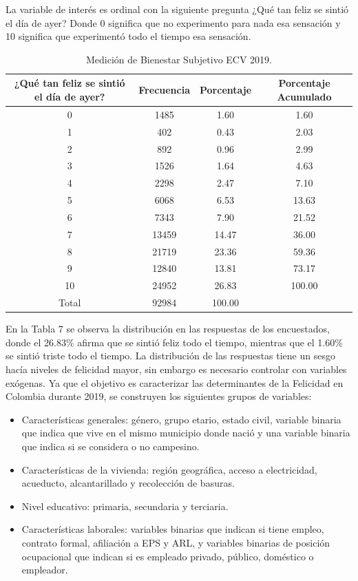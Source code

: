 \documentclass[12pt,spanish]{article}
\begin{document}
La variable de interés es ordinal con la siguiente pregunta ¿Qué tan feliz se sintió el día de ayer? Donde 0 significa que no experimento para nada esa sensación y 10 significa que experimentó todo el tiempo esa sensación.

\begin{table}[H]
\caption{Medición de Bienestar Subjetivo ECV 2019.}
\centering
\begin{tabular}{|c|c|c|c|}
\hline
¿Qué tan feliz se sintió el día de ayer? & Frecuencia & Porcentaje & Porcentaje Acumulado \\ \hline
0     & 1485  & 1.60   & 1.60   \\ \hline
1     & 402   & 0.43   & 2.03   \\ \hline
2     & 892   & 0.96   & 2.99   \\ \hline
3     & 1526  & 1.64   & 4.63   \\ \hline
4     & 2298  & 2.47   & 7.10   \\ \hline
5     & 6068  & 6.53   & 13.63  \\ \hline
6     & 7343  & 7.90   & 21.52  \\ \hline
7     & 13459 & 14.47  & 36.00  \\ \hline
8     & 21719 & 23.36  & 59.36  \\ \hline
9     & 12840 & 13.81  & 73.17  \\ \hline
10    & 24952 & 26.83  & 100.00 \\ \hline
Total & 92984 & 100.00 &        \\ \hline
\end{tabular}
\label{tab:tab3}
\end{table}

En la Tabla 7 se observa la distribución en las respuestas de los encuestados, donde el 26.83\% afirma que se sintió feliz todo el tiempo, mientras que el 1.60\% se sintió triste todo el tiempo. La distribución de las respuestas tiene un sesgo hacía niveles de felicidad mayor, sin embargo es necesario controlar con variables exógenas.  Ya que el objetivo es caracterizar las determinantes de la Felicidad en Colombia durante 2019, se construyen los siguientes grupos de variables: 
\begin{itemize}
    \item Características generales: género, grupo etario, estado civil, variable binaria que indica que vive en el mismo municipio donde nació y una variable binaria que indica si se considera o no campesino. 
    \item Características de la vivienda: región geográfica, acceso a electricidad, acueducto, alcantarillado y recolección de basuras. 
    \item Nivel educativo: primaria, secundaria y terciaria. 
    \item Características laborales: variables binarias que indican si tiene empleo, contrato formal, afiliación a EPS y ARL, y variables binarias de posición ocupacional que indican si es empleado privado, público, doméstico o empleador. 
\end{itemize}
\end{document}
